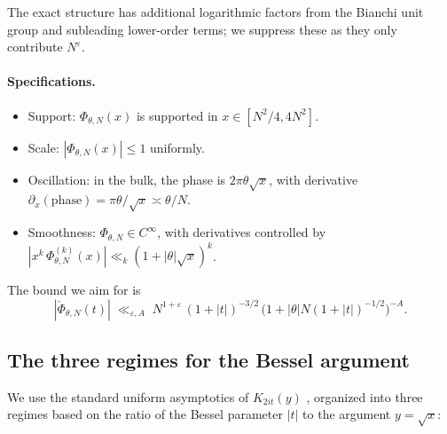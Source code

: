 \documentclass[11pt]{article}
\theoremstyle{definition}
\begin{document}
The exact structure has additional logarithmic factors from the Bianchi unit group and subleading lower-order terms; we suppress these as they only contribute $N^\varepsilon$.

\paragraph{Specifications.}
\begin{itemize}
    \item Support: $\Phi_{\theta,N}(x)$ is supported in $x \in [N^2/4, 4N^2]$.
    \item Scale: $|\Phi_{\theta,N}(x)| \le 1$ uniformly.
    \item Oscillation: in the bulk, the phase is $2\pi\theta\sqrt x$, with derivative $\partial_x(\text{phase}) = \pi\theta/\sqrt x \asymp \theta/N$.
    \item Smoothness: $\Phi_{\theta,N} \in C^\infty$, with derivatives controlled by $|x^k\,\Phi_{\theta,N}^{(k)}(x)| \ll_k (1+|\theta|\sqrt x)^k$.
\end{itemize}

The bound we aim for is
\begin{equation}\label{eq:check-Phi-target}
    |\check\Phi_{\theta,N}(t)| \;\ll_{\varepsilon,A}\; N^{1+\varepsilon}\,(1+|t|)^{-3/2}\,\bigl(1+|\theta|N(1+|t|)^{-1/2}\bigr)^{-A}.
\end{equation}

\subsection{The three regimes for the Bessel argument}\label{ssec:regimes}

We use the standard uniform asymptotics of $K_{2it}(y)$ \cite[Ch.~10]{olver}, organized into three regimes based on the ratio of the Bessel parameter $|t|$ to the argument $y = \sqrt x$:
\end{document}
